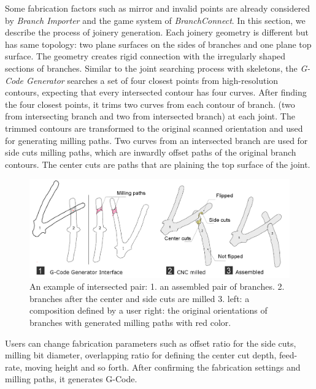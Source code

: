 Some fabrication factors such as mirror and invalid points are already considered by \textit{Branch Importer} and the game system of \textit{BranchConnect}.
In this section, we describe the process of joinery generation.
Each joinery geometry is different but has same topology: two plane surfaces on the sides of branches and one plane top surface.
The geometry creates rigid connection with the irregularly shaped sections of branches.
Similar to the joint searching process with skeletons, the \textit{G-Code Generator} searches a set of four closest points from high-resolution contours, expecting that every intersected contour has four curves.
After finding the four closest points, it trims two curves from each contour of branch. (two from intersecting branch and two from intersected branch) at each joint.
The trimmed contours are transformed to the original scanned orientation and used for generating milling paths.
Two curves from an intersected branch are used for side cuts milling paths, which are inwardly offset paths of the original branch contours. 
The center cuts are paths that are plaining the top surface of the joint.

\begin{figure}[ht]
  \begin{center}
    \includegraphics[width = 0.4\paperwidth]{images/system/joint_milling_diagram_4.png}
    \caption{An example of intersected pair: 1. an assembled pair of branches. 2. branches after the center and side cuts are milled 3. left: a composition defined by a user right: the original orientations of branches with generated milling paths with red color.  }
    \label{fig:joint_geometry}
  \end{center}
\end{figure}

Users can change fabrication parameters such as offset ratio for the side cuts, milling bit diameter, overlapping ratio for defining the center cut depth, feed-rate, moving height and so forth.
After confirming the fabrication settings and milling paths, it generates G-Code.
